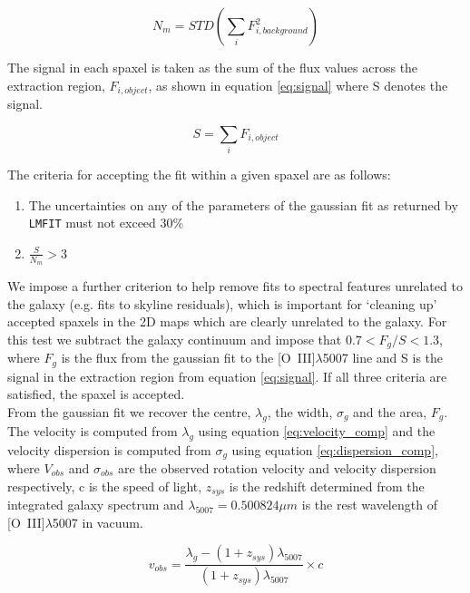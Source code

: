 \documentclass[fleqn,usenatbib]{mn2e}
\begin{document}
\begin{equation}\label{eq:noise}
    N_{m} = STD\left(\sum_{i}F_{i,background}^{2}\right)
\end{equation}

The signal in each spaxel is taken as the sum of the flux values across the extraction region, $F_{i,object}$, as shown in equation \ref{eq:signal} where S denotes the signal.

\begin{equation}\label{eq:signal}
    S = \sum_{i}F_{i,object}
\end{equation}

The criteria for accepting the fit within a given spaxel are as follows:

\begin{enumerate}
\item The uncertainties on any of the parameters of the gaussian fit as returned by {\tt LMFIT} must not exceed 30\%
\item $\frac{S}{N_{m}} > 3$
\end{enumerate}

We impose a further criterion to help remove fits to spectral features unrelated to the galaxy (e.g. fits to skyline residuals), which is important for `cleaning up' accepted spaxels in the 2D maps which are clearly unrelated to the galaxy. For this test we subtract the galaxy continuum and impose that $0.7 < F_{g}/{S} < 1.3$, where $F_{g}$ is the flux from the gaussian fit to the [O~{\sc III}]$\lambda$5007 line and S is the signal in the extraction region from equation \ref{eq:signal}. If all three criteria are satisfied, the spaxel is accepted. \\

From the gaussian fit we recover the centre, $\lambda_{g}$, the width, $\sigma_{g}$ and the area, $F_{g}$.
The velocity is computed from $\lambda_{g}$ using equation \ref{eq:velocity_comp} and the velocity dispersion is computed from $\sigma_{g}$ using equation \ref{eq:dispersion_comp}, where $V_{obs}$ and $\sigma_{obs}$ are the observed rotation velocity and velocity dispersion respectively, c is the speed of light, $z_{sys}$ is the redshift determined from the integrated galaxy spectrum and $\lambda_{5007} = 0.500824\mu m$ is the rest wavelength of [O~{\sc III}]$\lambda$5007 in vacuum.

\begin{equation}\label{eq:velocity_comp}
   v_{obs} = \frac{\lambda_{g} - (1 + z_{sys})\lambda_{5007}}{(1 + z_{sys})\lambda_{5007}} \times c
\end{equation}
\end{document}
